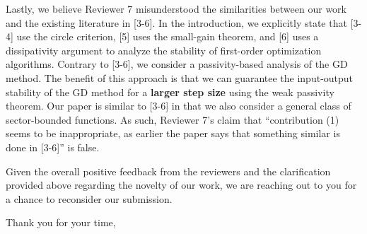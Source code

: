 \begin{flushleft}
    Lastly, we believe Reviewer 7 misunderstood the similarities between our work and the existing literature in [3-6]. In the introduction, we explicitly state that [3-4] use the circle criterion, [5] uses the small-gain theorem, and [6] uses a dissipativity argument to analyze the stability of first-order optimization algorithms. Contrary to [3-6], we consider a passivity-based analysis of the GD method. The benefit of this approach is that we can guarantee the input-output stability of the GD method for a \textbf{larger step size} using the weak passivity theorem. Our paper is similar to [3-6] in that we also consider a general class of sector-bounded functions. As such, Reviewer 7's claim that ``contribution (1) seems to be inappropriate, as earlier the paper says that something similar is done in [3-6]'' is false.

    Given the overall positive feedback from the reviewers and the clarification provided above regarding the novelty of our work, we are reaching out to you for a chance to reconsider our submission.

    Thank you for your time,\\[1em]%
    \theauthor
\end{flushleft}
\newpage